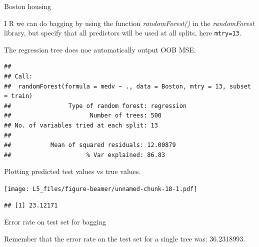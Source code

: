 \documentclass[
  ignorenonframetext,
]{beamer}
\begin{document}
\begin{frame}[fragile]

\begin{block}{Boston housing}

I R we can do bagging by using the function \emph{randomForest()} in the
\emph{randomForest} library, but specify that all predictors will be
used at all splits, here \texttt{mtry=13}.

The regression tree does noe automatically output OOB MSE.

\begin{verbatim}
## 
## Call:
##  randomForest(formula = medv ~ ., data = Boston, mtry = 13, subset = train) 
##                Type of random forest: regression
##                      Number of trees: 500
## No. of variables tried at each split: 13
## 
##           Mean of squared residuals: 12.00879
##                     % Var explained: 86.83
\end{verbatim}

Plotting predicted test values vs true values.

\texttt{[image: L5\_files/figure-beamer/unnamed-chunk-18-1.pdf]}

\begin{verbatim}
## [1] 23.12171
\end{verbatim}

Error rate on test set for bagging

Remember that the error rate on the test set for a single tree was:
36.2318993.

\end{block}

\end{frame}
\end{document}
